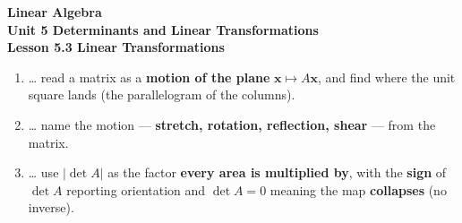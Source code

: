 \documentclass[10pt]{article}
\begin{document}
\vspace{-0.8in}

\begin{center}
  {\color{white}\textbf{\LARGE Linear Algebra}}\\[4pt]
  {\color{blushmid}\large\textbf{Unit 5 \quad Determinants and Linear Transformations}}\\[6pt]
  {\color{white}\textbf{\large Lesson 5.3 \quad Linear Transformations}}
\end{center}

\vspace{0.22in}
\namedateperiod
\vspace{0.18in}

\begin{learningtargetbox}
\small
\begin{enumerate}[leftmargin=1.5em, itemsep=5pt]
  \item \ldots{} read a matrix as a \textbf{motion of the plane} $\mathbf{x}\mapsto A\mathbf{x}$, and find where the unit square lands (the parallelogram of the columns).
  \item \ldots{} name the motion --- \textbf{stretch, rotation, reflection, shear} --- from the matrix.
  \item \ldots{} use $|\det A|$ as the factor \textbf{every area is multiplied by}, with the \textbf{sign} of $\det A$ reporting orientation and $\det A=0$ meaning the map \textbf{collapses} (no inverse).
\end{enumerate}
\end{learningtargetbox}

\vspace{0.14in}
\end{document}
